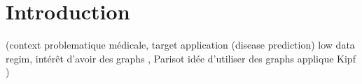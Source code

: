 

\section{Introduction}

(context problematique médicale, target application (disease prediction) low data regim, intérêt d'avoir des graphs , Parisot idée d'utiliser des graphs applique Kipf )
